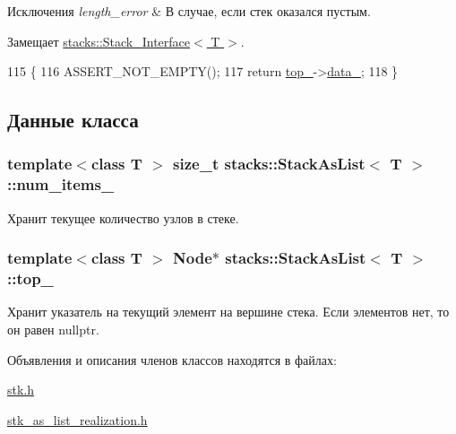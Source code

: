 \begin{DoxyExceptions}{Исключения}
{\em length\+\_\+error} & В случае, если стек оказался пустым. \\
\hline
\end{DoxyExceptions}


Замещает \hyperlink{classstacks_1_1_stack___interface_a367aa4742f24927015a2b9a396faee56}{stacks\+::\+Stack\+\_\+\+Interface$<$ T $>$}.


\begin{DoxyCode}
115                           \{
116         ASSERT\_NOT\_EMPTY();
117         \textcolor{keywordflow}{return} \hyperlink{classstacks_1_1_stack_as_list_a0e0590bb339a3fb55b8f1cdac941769a}{top\_}->\hyperlink{structstacks_1_1_stack_as_list_1_1_node_a088b1a89491b40c68e329991d1a13192}{data\_};
118     \}
\end{DoxyCode}


\subsection{Данные класса}
\hypertarget{classstacks_1_1_stack_as_list_a09f45c7af846b515531bd9368b772f27}{}
\subsubsection[{num\+\_\+items\+\_\+}]{\setlength{\rightskip}{0pt plus 5cm}template$<$class T $>$ size\+\_\+t {\bf stacks\+::\+Stack\+As\+List}$<$ T $>$\+::num\+\_\+items\+\_\+\hspace{0.3cm}{\ttfamily [private]}}\label{classstacks_1_1_stack_as_list_a09f45c7af846b515531bd9368b772f27}


Хранит текущее количество узлов в стеке. 

\hypertarget{classstacks_1_1_stack_as_list_a0e0590bb339a3fb55b8f1cdac941769a}{}
\subsubsection[{top\+\_\+}]{\setlength{\rightskip}{0pt plus 5cm}template$<$class T $>$ {\bf Node}$\ast$ {\bf stacks\+::\+Stack\+As\+List}$<$ T $>$\+::top\+\_\+\hspace{0.3cm}{\ttfamily [private]}}\label{classstacks_1_1_stack_as_list_a0e0590bb339a3fb55b8f1cdac941769a}


Хранит указатель на текущий элемент на вершине стека. Если элементов нет, то он равен nullptr. 



Объявления и описания членов классов находятся в файлах\+:\begin{DoxyCompactItemize}
\item 
\hyperlink{stk_8h}{stk.\+h}\item 
\hyperlink{stk__as__list__realization_8h}{stk\+\_\+as\+\_\+list\+\_\+realization.\+h}\end{DoxyCompactItemize}
